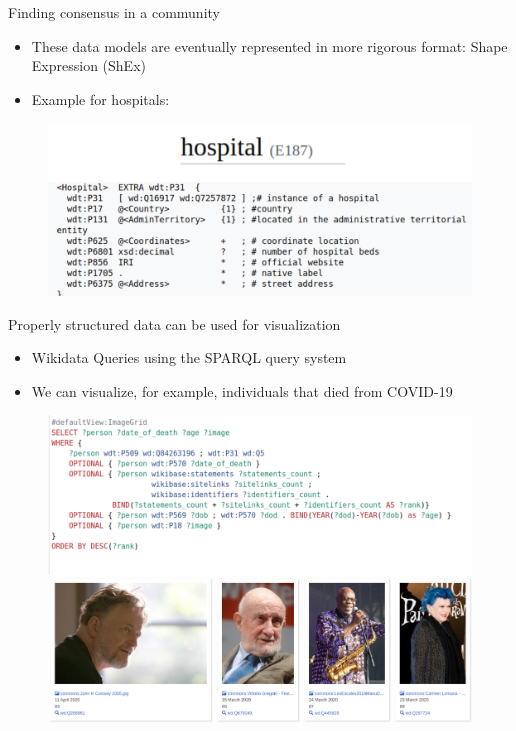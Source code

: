 \documentclass{beamer}
\begin{document}
\begin{frame}{Finding consensus in a community}
\begin{itemize}
    \item These data models are eventually represented in more rigorous format: Shape Expression (ShEx)
    \item Example for hospitals:
\end{itemize}
\begin{figure}
\includegraphics[scale=0.65]{fig/shex_hospitals.png}
\end{figure}
\end{frame}




\begin{frame}{Properly structured data can be used for visualization}
\begin{itemize}
    \item Wikidata Queries using the SPARQL query system 
    \item We can visualize, for example, individuals that died from COVID-19
\end{itemize}
\begin{figure}
\includegraphics[scale=0.65]{fig/covid19_deaths.png}
\end{figure}
\end{frame}
\end{document}
